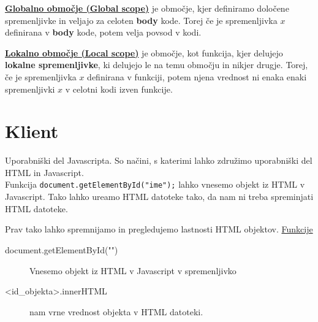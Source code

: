 \underline{\textbf{Globalno območje (Global scope)}} je območje, kjer definiramo določene spremenljivke in veljajo za celoten \textbf{body} kode. Torej če je spremenljivka $x$ definirana v \textbf{body} kode, potem velja povsod v kodi.

\textbf{\underline{Lokalno območje (Local scope)}} je območje, kot funkcija, kjer delujejo \textbf{lokalne spremenljivke}, ki delujejo le na temu območju in nikjer drugje. Torej, če je spremenljivka $x$ definirana v funkciji, potem njena vrednost ni enaka enaki spremenljivki $x$ v celotni kodi izven funkcije.

\section{Klient}

Uporabniški del Javascripta. So načini, s katerimi lahko združimo uporabniški del HTML in Javascript.\\

Funkcija \texttt{document.getElementById("ime");} lahko vnesemo objekt iz HTML v Javascript. Tako lahko ureamo HTML datoteke tako, da nam ni treba spreminjati HTML datoteke.

Prav tako lahko spremnijamo in pregledujemo lastnosti HTML objektov.
\underline{Funkcije}
\begin{description}
	\item[document.getElementById("")] Vnesemo objekt iz HTML v Javascript v spremenljivko
	\item[<id\_objekta>.innerHTML] nam vrne vrednost objekta v HTML datoteki. 
\end{description}